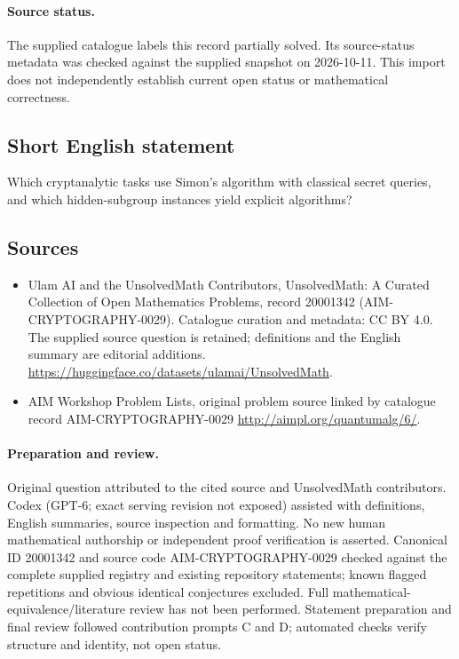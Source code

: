 \documentclass[11pt]{article}
\begin{document}
\paragraph{Source status.}
The supplied catalogue labels this record partially solved. Its source-status metadata was checked against the supplied snapshot on 2026-10-11. This import does not independently establish current open status or mathematical correctness.
\subsection{Short English statement}
Which cryptanalytic tasks use Simon's algorithm with classical secret queries, and which hidden-subgroup instances yield explicit algorithms?
\subsection{Sources}
\begin{itemize}
\item[\hypertarget{source:20001342:1}{S1}] Ulam AI and the UnsolvedMath Contributors, UnsolvedMath: A Curated Collection of Open Mathematics Problems, record 20001342 (AIM-CRYPTOGRAPHY-0029). Catalogue curation and metadata: CC BY 4.0. The supplied source question is retained; definitions and the English summary are editorial additions.
\url{https://huggingface.co/datasets/ulamai/UnsolvedMath}.
\item[\hypertarget{source:20001342:2}{S2}] AIM Workshop Problem Lists, original problem source linked by catalogue record AIM-CRYPTOGRAPHY-0029
\url{http://aimpl.org/quantumalg/6/}.
\end{itemize}
\paragraph{Preparation and review.}
Original question attributed to the cited source and UnsolvedMath contributors. Codex (GPT-6; exact serving revision not exposed) assisted with definitions, English summaries, source inspection and formatting. No new human mathematical authorship or independent proof verification is asserted. Canonical ID 20001342 and source code AIM-CRYPTOGRAPHY-0029 checked against the complete supplied registry and existing repository statements; known flagged repetitions and obvious identical conjectures excluded. Full mathematical-equivalence/literature review has not been performed. Statement preparation and final review followed contribution prompts C and D; automated checks verify structure and identity, not open status.
\label{end:20001342}
\end{document}
